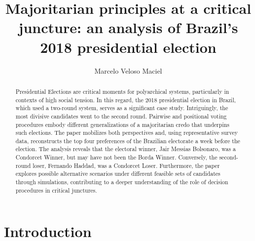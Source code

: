 \documentclass[hidelinks,11pt]{article} \usepackage[utf8]{inputenc}
\author{Marcelo Veloso Maciel
} \date{}
\title{Majoritarian principles at a critical juncture: an analysis of Brazil's
  2018 presidential election}
\begin{document}
\maketitle
\begin{abstract}

  Presidential Elections are critical moments for polyarchical systems,
  particularly in contexts of high social tension. In this regard, the 2018
  presidential election in Brazil, which used a two-round system, serves as a
  significant case study. Intriguingly, the most divisive candidates went to the
  second round. Pairwise and positional voting procedures embody different
  generalizations of a majoritarian credo that underpins such elections. The
  paper mobilizes both perspectives and, using representative survey data,
  reconstructs the top four preferences of the Brazilian electorate a week
  before the election. The analysis reveals that the electoral winner, Jair
  Messias Bolsonaro, was a Condorcet Winner, but may have not been the Borda
  Winner. Conversely, the second-round loser, Fernando Haddad, was a Condorcet
  Loser. Furthermore, the paper explores possible alternative scenarios under
  different feasible sets of candidates through simulations, contributing to a
  deeper understanding of the role of decision procedures in critical junctures.


  \end{abstract}
\section{Introduction}
\end{document}
